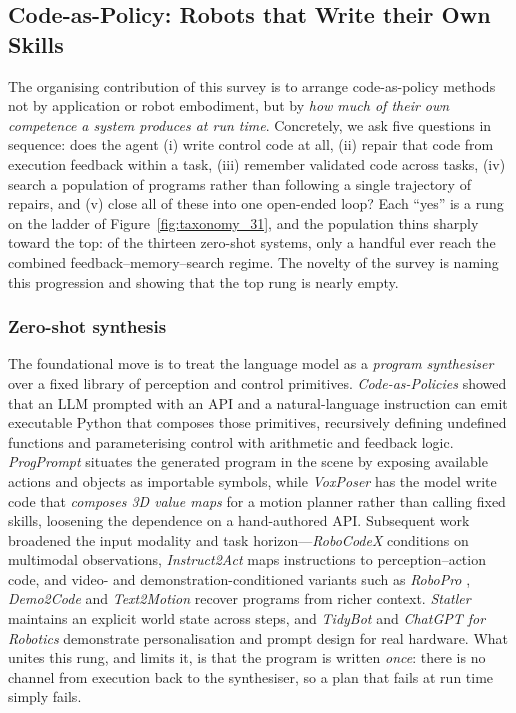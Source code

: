 \subsection{Code-as-Policy: Robots that Write their Own Skills}
\label{sec:code}

The organising contribution of this survey is to arrange code-as-policy methods not by
application or robot embodiment, but by \emph{how much of their own competence a system
produces at run time}. Concretely, we ask five questions in sequence: does the agent (i)
write control code at all, (ii) repair that code from execution feedback within a task,
(iii) remember validated code across tasks, (iv) search a population of programs rather
than following a single trajectory of repairs, and (v) close all of these into one
open-ended loop? Each ``yes'' is a rung on the ladder of Figure~\ref{fig:taxonomy_31}, and
the population thins sharply toward the top: of the thirteen zero-shot systems, only a
handful ever reach the combined feedback--memory--search regime. The novelty of the
survey is naming this progression and showing that the top rung is nearly empty.




\subsubsection{Zero-shot synthesis}
\label{ssec:zeroshot}
The foundational move is to treat the language model as a \emph{program synthesiser} over
a fixed library of perception and control primitives. \emph{Code-as-Policies}
\citep{codeaspolicies} showed that an LLM prompted with an API and a natural-language
instruction can emit executable Python that composes those primitives, recursively
defining undefined functions and parameterising control with arithmetic and feedback
logic. \emph{ProgPrompt} \citep{progprompt} situates the generated program in the scene
by exposing available actions and objects as importable symbols, while \emph{VoxPoser}
\citep{voxposer} has the model write code that \emph{composes 3D value maps} for a motion
planner rather than calling fixed skills, loosening the dependence on a hand-authored API.
Subsequent work broadened the input modality and task horizon---\emph{RoboCodeX}
\citep{robocodex} conditions on multimodal observations, \emph{Instruct2Act}
\citep{instruct2act} maps instructions to perception--action code, and video- and
demonstration-conditioned variants such as \emph{RoboPro} \citep{robopro},
\emph{Demo2Code} \citep{demo2code} and \emph{Text2Motion} \citep{text2motion} recover
programs from richer context. \emph{Statler} \citep{statler} maintains an explicit world
state across steps, and \emph{TidyBot} \citep{tidybot} and \emph{ChatGPT for Robotics}
\citep{chatgptrobotics} demonstrate personalisation and prompt design for real hardware.
What unites this rung, and limits it, is that the program is written \emph{once}: there is
no channel from execution back to the synthesiser, so a plan that fails at run time simply
fails.

